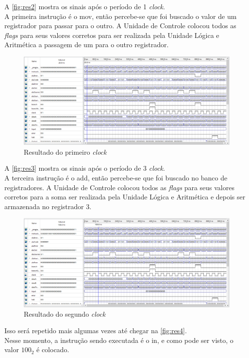 \documentclass[
	12pt,
	openright,
	a4paper,
	english,			
	french,				
	spanish,			
	brazil,				
	]{abntex2}
\begin{document}
A \autoref{fig:res2} mostra os sinais após o período de 1 \emph{clock}.\\
A primeira instrução é o mov, então percebe-se que foi buscado o valor de um registrador para passar para o outro.
A Unidade de Controle colocou todos as \emph{flags} para seus valores corretos para ser realizada pela Unidade Lógica e Aritmética a passagem de um para o outro registrador.
\begin{figure}[H]
\centering 
\caption{Resultado do primeiro \emph{clock}} \label{fig:res2}
\includegraphics[scale=0.5]{res2.png}
\end{figure}

A \autoref{fig:res3} mostra os sinais após o período de 3 \emph{clock}.\\
A terceira instrução é o add, então percebe-se que foi buscado no banco de registradores.
A Unidade de Controle colocou todos as \emph{flags} para seus valores corretos para a soma ser realizada pela Unidade Lógica e Aritmética e depois ser armazenada 
no registrador 3.\\


\begin{figure}[H]
\centering 
\caption{Resultado do segundo \emph{clock}} \label{fig:res3}
\includegraphics[scale=0.5]{res3.png}
\end{figure}

Isso será repetido mais algumas vezes até chegar na \autoref{fig:res4}.\\
Nesse momento, a instrução sendo executada é o in, e como pode ser visto, o valor $100_2$ é colocado.\\
\end{document}
